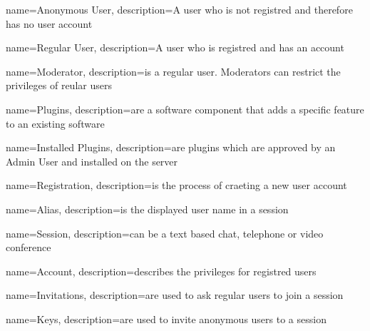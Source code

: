 {
  name=Anonymous User,
  description={A user who is not registred and therefore has no user account}
}

{
  name=Regular User,
  description={A user who is registred and has an account}
}

{
  name=Moderator,
  description={is a regular user. Moderators can restrict the privileges of reular users}
}

{
  name=Plugins,
  description={are a software component that adds a specific feature to an existing software}
}

{
  name=Installed Plugins,
  description={are plugins which are approved by an Admin User and installed on the server}
}

{
  name=Registration,
  description={is the process of craeting a new user account}
}

{
  name=Alias,
  description={is the displayed user name in a session}
}

{
  name=Session,
  description={can be a text based chat, telephone or video conference}
}

{
  name=Account,
  description={describes the privileges for registred users}
}

{
  name=Invitations,
  description={are used to ask regular users to join a session}
}

{
  name=Keys,
  description={are used to invite anonymous users to a session}
}
